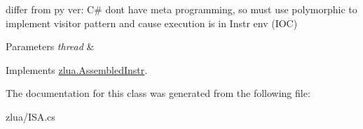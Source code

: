 differ from py ver\+: C\# dont have meta programming, so must use polymorphic to implement visitor pattern and cause execution is in Instr env (I\+OC) 


\begin{DoxyParams}{Parameters}
{\em thread} & \\
\hline
\end{DoxyParams}


Implements \mbox{\hyperlink{classzlua_1_1_assembled_instr_a44e081c4565b90b75e4a67b8dd418feb}{zlua.\+Assembled\+Instr}}.



The documentation for this class was generated from the following file\+:\begin{DoxyCompactItemize}
\item 
zlua/I\+S\+A.\+cs\end{DoxyCompactItemize}
